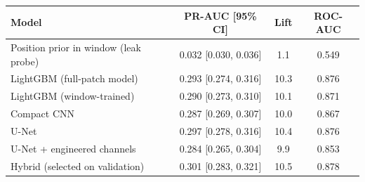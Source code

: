 \begin{tabular}{lccc}
\toprule
Model & PR-AUC [95\% CI] & Lift & ROC-AUC \\
\midrule
Position prior in window (leak probe) & 0.032 [0.030, 0.036] & 1.1 & 0.549 \\
LightGBM (full-patch model) & 0.293 [0.274, 0.316] & 10.3 & 0.876 \\
LightGBM (window-trained) & 0.290 [0.273, 0.310] & 10.1 & 0.871 \\
Compact CNN & 0.287 [0.269, 0.307] & 10.0 & 0.867 \\
U-Net & 0.297 [0.278, 0.316] & 10.4 & 0.876 \\
U-Net + engineered channels & 0.284 [0.265, 0.304] & 9.9 & 0.853 \\
Hybrid (selected on validation) & 0.301 [0.283, 0.321] & 10.5 & 0.878 \\
\bottomrule
\end{tabular}
